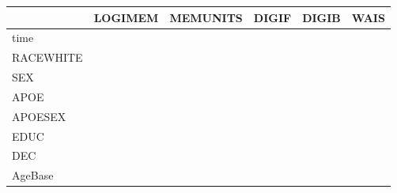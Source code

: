 \documentclass[
]{article}
\begin{document}
\begin{longtable}[t]{l|l|l|l|l|l}
\hline
  & LOGIMEM & MEMUNITS & DIGIF & DIGIB & WAIS\\
\hline
time & \cellcolor{white}{-0.08 (-0.27, 0.10)} & \cellcolor{white}{-0.01 (-0.20, 0.18)} & \cellcolor{red}{-0.17 (-0.31, -0.03)} & \cellcolor{red}{-0.39 (-0.54, -0.24)} & \cellcolor{red}{-0.18 (-0.33, -0.03)}\\
\hline
RACEWHITE & \cellcolor{red}{-0.25 (-0.41, -0.09)} & \cellcolor{red}{-0.30 (-0.46, -0.15)} & \cellcolor{white}{-0.05 (-0.17, 0.06)} & \cellcolor{white}{0.05 (-0.07, 0.18)} & \cellcolor{white}{-0.23 (-0.34, -0.12)}\\
\hline
SEX & \cellcolor{red}{-0.15 (-0.29, -0.02)} & \cellcolor{red}{-0.21 (-0.36, -0.07)} & \cellcolor{white}{0.08 (-0.02, 0.17)} & \cellcolor{white}{0.10 (-0.00, 0.20)} & \cellcolor{white}{0.01 (-0.11, 0.13)}\\
\hline
APOE & \cellcolor{red}{-0.24 (-0.42, -0.06)} & \cellcolor{red}{-0.22 (-0.40, -0.04)} & \cellcolor{white}{0.01 (-0.12, 0.14)} & \cellcolor{green}{0.24 (0.11, 0.38)} & \cellcolor{white}{-0.03 (-0.16, 0.10)}\\
\hline
APOESEX & \cellcolor{white}{0.11 (-0.10, 0.33)} & \cellcolor{white}{-0.01 (-0.23, 0.22)} & \cellcolor{white}{-0.09 (-0.24, 0.06)} & \cellcolor{red}{-0.30 (-0.46, -0.14)} & \cellcolor{red}{-0.15 (-0.31, 0.00)}\\
\hline
EDUC & \cellcolor{white}{0.00 (-0.00, 0.01)} & \cellcolor{white}{0.00 (-0.00, 0.01)} & \cellcolor{white}{0.00 (-0.00, 0.01)} & \cellcolor{white}{0.00 (-0.00, 0.01)} & \cellcolor{white}{-0.01 (-0.01, -0.00)}\\
\hline
DEC & \cellcolor{red}{-0.17 (-0.30, -0.05)} & \cellcolor{white}{-0.10 (-0.24, 0.02)} & \cellcolor{red}{-0.11 (-0.22, -0.00)} & \cellcolor{red}{-0.16 (-0.27, -0.05)} & \cellcolor{red}{-0.31 (-0.41, -0.21)}\\
\hline
AgeBase & \cellcolor{red}{-0.01 (-0.02, -0.01)} & \cellcolor{red}{-0.02 (-0.02, -0.01)} & \cellcolor{white}{0.00 (-0.00, 0.01)} & \cellcolor{red}{-0.01 (-0.01, -0.00)} & \cellcolor{red}{-0.01 (-0.02, -0.01)}\\
\hline
\end{longtable}
\endgroup{}

\begingroup\fontsize{7}{9}\selectfont
\end{document}
